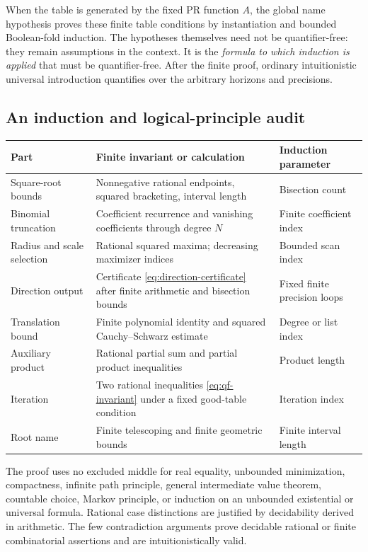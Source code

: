 \documentclass[11pt,letterpaper]{article}
\theoremstyle{definition}\newtheorem{definition}[theorem]{Definition}
\theoremstyle{remark}\newtheorem{remark}[theorem]{Remark}
\begin{document}
When the table is generated by the fixed PR function $A$, the global
name hypothesis proves these finite table conditions by instantiation and
bounded Boolean-fold induction. The hypotheses themselves need not be
quantifier-free: they remain assumptions in the context. It is the
\emph{formula to which induction is applied} that must be quantifier-free.
After the finite proof, ordinary intuitionistic universal introduction
quantifies over the arbitrary horizons and precisions.

\subsection{An induction and logical-principle audit}

\begin{longtable}{@{}>{\raggedright\arraybackslash}p{}>{\raggedright\arraybackslash}p{}>{\raggedright\arraybackslash}p{}@{}}
\toprule
Part & Finite invariant or calculation & Induction parameter \\
\midrule
\endhead
Square-root bounds & Nonnegative rational endpoints, squared bracketing,
interval length & Bisection count \\
Binomial truncation & Coefficient recurrence and vanishing coefficients
through degree $N$ & Finite coefficient index \\
Radius and scale selection & Rational squared maxima; decreasing
maximizer indices & Bounded scan index \\
Direction output & Certificate \eqref{eq:direction-certificate} after
finite arithmetic and bisection bounds & Fixed finite precision loops \\
Translation bound & Finite polynomial identity and squared
Cauchy--Schwarz estimate & Degree or list index \\
Auxiliary product & Rational partial sum and partial product inequalities
& Product length \\
Iteration & Two rational inequalities \eqref{eq:qf-invariant} under a
fixed good-table condition & Iteration index \\
Root name & Finite telescoping and finite geometric bounds
& Finite interval length \\
\bottomrule
\end{longtable}

The proof uses no excluded middle for real equality, unbounded minimization,
compactness, infinite path principle, general intermediate value theorem,
countable choice, Markov principle, or induction on an unbounded
existential or universal formula. Rational case distinctions are justified
by decidability derived in arithmetic. The few contradiction arguments
prove decidable rational or finite combinatorial assertions and are
intuitionistically valid.
\end{document}
